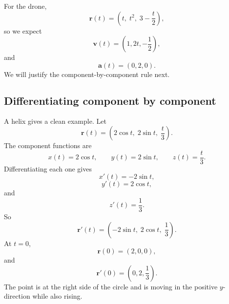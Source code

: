 For the drone,
\[
    \mathbf r(t)=\left(t,\;t^2,\;3-\frac{t}{2}\right),
\]
so we expect
\[
    \mathbf v(t)=\left(1,2t,-\frac12\right),
\]
and
\[
    \mathbf a(t)=(0,2,0).
\]
We will justify the component-by-component rule next.

\subsection{Differentiating component by component}

A helix gives a clean example.  Let
\[
    \mathbf r(t)=\left(2\cos t,\;2\sin t,\;\frac{t}{3}\right).
\]
The component functions are
\[
    x(t)=2\cos t,\qquad y(t)=2\sin t,\qquad z(t)=\frac{t}{3}.
\]
Differentiating each one gives
\[
    x'(t)=-2\sin t,
\]
\[
    y'(t)=2\cos t,
\]
and
\[
    z'(t)=\frac13.
\]
So
\[
    \mathbf r'(t)=\left(-2\sin t,\;2\cos t,\;\frac13\right).
\]
At \(t=0\),
\[
    \mathbf r(0)=(2,0,0),
\]
and
\[
    \mathbf r'(0)=\left(0,2,\frac13\right).
\]
The point is at the right side of the circle and is moving in the positive \(y\)-direction
while also rising.


